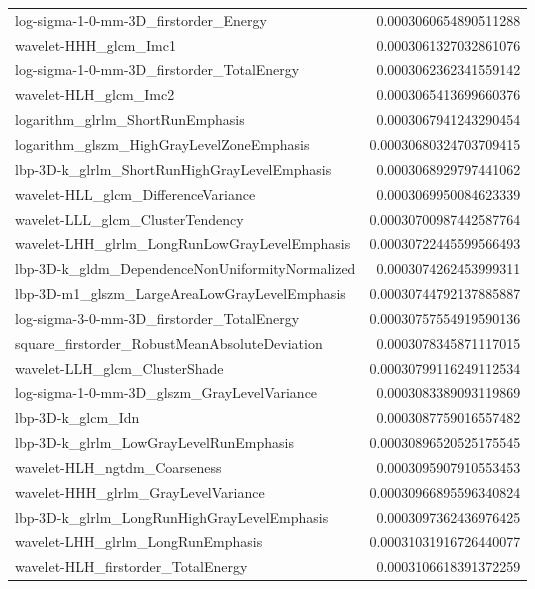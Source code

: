 {\begin{xltabular}[H]{\textwidth}{X r}
        log-sigma-1-0-mm-3D\_firstorder\_Energy & 0.0003060654890511288 \\
        wavelet-HHH\_glcm\_Imc1 & 0.0003061327032861076 \\
        log-sigma-1-0-mm-3D\_firstorder\_TotalEnergy & 0.0003062362341559142 \\
        wavelet-HLH\_glcm\_Imc2 & 0.0003065413699660376 \\
        logarithm\_glrlm\_ShortRunEmphasis & 0.0003067941243290454 \\
        logarithm\_glszm\_HighGrayLevelZoneEmphasis & 0.00030680324703709415 \\
        lbp-3D-k\_glrlm\_ShortRunHighGrayLevelEmphasis & 0.0003068929797441062 \\
        wavelet-HLL\_glcm\_DifferenceVariance & 0.0003069950084623339 \\
        wavelet-LLL\_glcm\_ClusterTendency & 0.00030700987442587764 \\
        wavelet-LHH\_glrlm\_LongRunLowGrayLevelEmphasis & 0.00030722445599566493 \\
        lbp-3D-k\_gldm\_DependenceNonUniformityNormalized & 0.0003074262453999311 \\
        lbp-3D-m1\_glszm\_LargeAreaLowGrayLevelEmphasis & 0.00030744792137885887 \\
        log-sigma-3-0-mm-3D\_firstorder\_TotalEnergy & 0.00030757554919590136 \\
        square\_firstorder\_RobustMeanAbsoluteDeviation & 0.0003078345871117015 \\
        wavelet-LLH\_glcm\_ClusterShade & 0.00030799116249112534 \\
        log-sigma-1-0-mm-3D\_glszm\_GrayLevelVariance & 0.0003083389093119869 \\
        lbp-3D-k\_glcm\_Idn & 0.0003087759016557482 \\
        lbp-3D-k\_glrlm\_LowGrayLevelRunEmphasis & 0.00030896520525175545 \\
        wavelet-HLH\_ngtdm\_Coarseness & 0.0003095907910553453 \\
        wavelet-HHH\_glrlm\_GrayLevelVariance & 0.00030966895596340824 \\
        lbp-3D-k\_glrlm\_LongRunHighGrayLevelEmphasis & 0.0003097362436976425 \\
        wavelet-LHH\_glrlm\_LongRunEmphasis & 0.00031031916726440077 \\
        wavelet-HLH\_firstorder\_TotalEnergy & 0.0003106618391372259 \\

\end{xltabular}}
